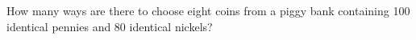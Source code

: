 \documentclass[../main.tex]{subfiles}
\begin{document}
How many ways are there to choose eight coins from a piggy bank containing 100 identical pennies and 80 identical nickels?

\solution
\end{document}
